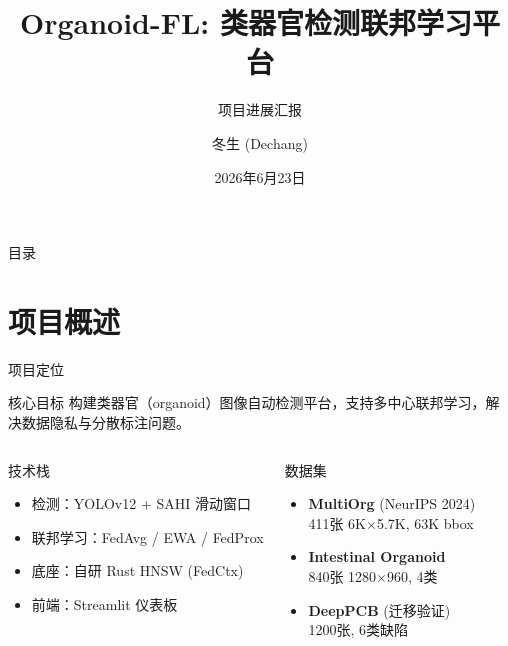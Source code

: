 \documentclass[aspectratio=169, 11pt]{beamer}
\title{Organoid-FL: 类器官检测联邦学习平台}
\subtitle{项目进展汇报}
\author{冬生 (Dechang)}
\institute{西交利物浦大学 \\ Academy of AI \quad Intelligent Science Department}
\date{2026年6月23日}
\begin{document}
\begin{frame}
  \titlepage
\end{frame}

\begin{frame}{目录}
  \tableofcontents
\end{frame}

\section{项目概述}

\begin{frame}{项目定位}
  \begin{block}{核心目标}
    构建类器官（organoid）图像自动检测平台，支持多中心联邦学习，解决数据隐私与分散标注问题。
  \end{block}
  \vspace{0.3em}
  \begin{columns}[T]
    \begin{block}{技术栈}
      \begin{itemize}
        \item 检测：YOLOv12 + SAHI 滑动窗口
        \item 联邦学习：FedAvg / EWA / FedProx
        \item 底座：自研 Rust HNSW (FedCtx)
        \item 前端：Streamlit 仪表板
      \end{itemize}
    \end{block}
    \begin{block}{数据集}
      \begin{itemize}
        \item \textbf{MultiOrg} (NeurIPS 2024)\\
              411张 6K$\times$5.7K, 63K bbox
        \item \textbf{Intestinal Organoid}\\
              840张 1280$\times$960, 4类
        \item \textbf{DeepPCB} (迁移验证)\\
              1200张, 6类缺陷
      \end{itemize}
    \end{block}
  \end{columns}
\end{frame}
\end{document}
